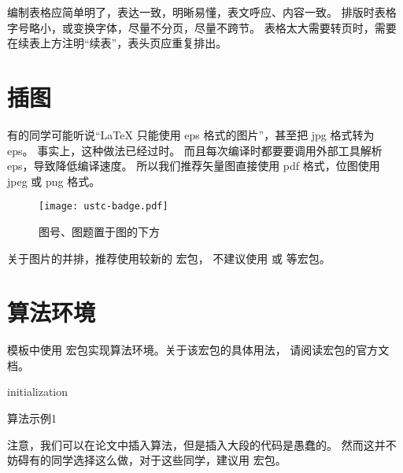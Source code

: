 编制表格应简单明了，表达一致，明晰易懂，表文呼应、内容一致。
排版时表格字号略小，或变换字体，尽量不分页，尽量不跨节。
表格太大需要转页时，需要在续表上方注明“续表”，表头页应重复排出。



\section{插图}

有的同学可能听说“\LaTeX{} 只能使用 eps 格式的图片”，甚至把 jpg 格式转为 eps。
事实上，这种做法已经过时。
而且每次编译时都要要调用外部工具解析 eps，导致降低编译速度。
所以我们推荐矢量图直接使用 pdf 格式，位图使用 jpeg 或 png 格式。

\begin{figure}
  \centering
  \texttt{[image: ustc-badge.pdf]}
  \caption{图号、图题置于图的下方}
  \label{fig:badge}
\end{figure}

关于图片的并排，推荐使用较新的  宏包，
不建议使用  或  等宏包。



\section{算法环境}

模板中使用  宏包实现算法环境。关于该宏包的具体用法，
请阅读宏包的官方文档。

\begin{algorithm}
  \SetAlgoLined

  initialization\;
  \caption{算法示例1}
  \label{algo:algorithm1}
\end{algorithm}

注意，我们可以在论文中插入算法，但是插入大段的代码是愚蠢的。
然而这并不妨碍有的同学选择这么做，对于这些同学，建议用  宏包。
